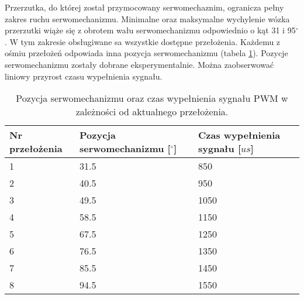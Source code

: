 Przerzutka, do której został przymocowany serwomechaznim, ogranicza pełny zakres ruchu serwomechanizmu. Minimalne oraz maksymalne wychylenie wózka przerzutki wiąże się z obrotem wału serwomechanizmu odpowiednio o kąt 31 i 95$^{\circ}$. W tym zakresie obsługiwane sa wszystkie dostępne przełożenia. Każdemu z ośmiu przełożeń odpowiada inna pozycja serwomechanizmu (tabela \ref{tab:przelozenia}). Pozycje serwomechanizmu zostały dobrane eksperymentalnie. Można zaobserwować liniowy przyrost czasu wypełnienia sygnału. 
\begin{table}[h]
    \caption{Pozycja serwomechanizmu oraz czas wypełnienia sygnału PWM w zależności od aktualnego przełożenia.}
    \begin{center}
		\label{tab:przelozenia}
		\begin{tabular}{|m{2.3cm}|m{3cm}|m{3cm}|}
			\hline
 			Nr przełożenia & Pozycja serwomechanizmu [$^{\circ}$] & Czas wypełnienia sygnału [$us$] \\
 			\hline
 			1 & 31.5 & 850 \\  
			2 & 40.5 & 950 \\
			3 & 49.5 & 1050 \\  
			4 & 58.5 & 1150 \\  
			5 & 67.5 & 1250 \\  
			6 & 76.5 & 1350 \\  
			7 & 85.5 & 1450 \\  
			8 & 94.5 & 1550 \\  
			\hline
		\end{tabular}
	\end{center}
\end{table}

